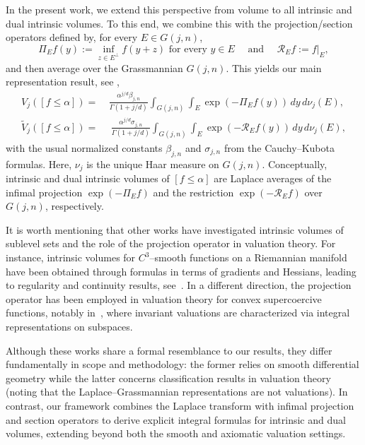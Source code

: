 \documentclass[11pt]{article}
\theoremstyle{definition}
\numberwithin{equation}{section}
\newcommand{\Gr}[2]{G(#1,#2)}        %
\begin{document}
In the present work, we extend this perspective from volume to all intrinsic and dual intrinsic volumes.
To this end,  we combine this with the projection/section operators defined by, for every $E \in \Gr{j}{n}$,
\[
\Pi_E f(y):=\inf_{z\in E^\perp} f(y+z) \text{ for every  $y \in E$} \quad \text{ and } \quad \mathscr R_E f:=f|_E,
\]
and then average over the Grassmannian \(\Gr{j}{n}\). 
This yields our main representation result, see ,
\begin{equation}\label{LG-repre}
\begin{split}
    V_j([f\le \alpha]) 
    = & ~ \frac{\alpha^{j/d}\beta_{j,n}}{\Gamma(1+j/d)}
    \int_{\Gr{j}{n}}\int_E \exp(-\Pi_E f(y))\,dy\,d\nu_j(E),\\
    \widetilde V_j([f\le \alpha]) 
    = & ~ \ \frac{\alpha^{j/d} \sigma_{j,n}}{\Gamma(1+j/d)}
    \int_{\Gr{j}{n}}\int_E \exp(-\mathscr R_E f(y))\,dy \,d\nu_j(E),
\end{split}
\end{equation}
with the usual normalized constants \(\beta_{j,n}\) and \(\sigma_{j,n}\) from the Cauchy--Kubota formulas.
Here, \(\nu_j\) is the unique Haar measure on \(\Gr{j}{n}\). 
Conceptually, intrinsic and dual intrinsic volumes of \([f\le\alpha]\) are Laplace averages of the infimal projection \(\exp(-\Pi_E f)\) and the restriction \(\exp(-\mathscr R_E f)\) over $\Gr{j}{n}$, respectively.

\medskip

It is worth mentioning that other works have investigated intrinsic volumes of sublevel sets and the role of the projection operator in valuation theory.
For instance, intrinsic volumes for $C^3$--smooth functions on a Riemannian manifold have been obtained through formulas in terms of gradients and Hessians, leading to regularity and continuity results, see~\cite{J_2019}.
In a different direction, the projection operator has been employed in valuation theory for convex supercoercive functions, notably in~\cite{CLM_2022, CLM_2025}, where invariant valuations are characterized via integral representations on subspaces.

\medskip

Although these works share a formal resemblance to our results, they differ fundamentally in scope and methodology: the former relies on smooth differential geometry while the latter concerns classification results in valuation theory (noting that the Laplace–Grassmannian representations are not valuations).
In contrast, our framework combines the Laplace transform with infimal projection and section operators to derive explicit integral formulas for intrinsic and dual volumes, extending beyond both the smooth and axiomatic valuation settings.
\end{document}
